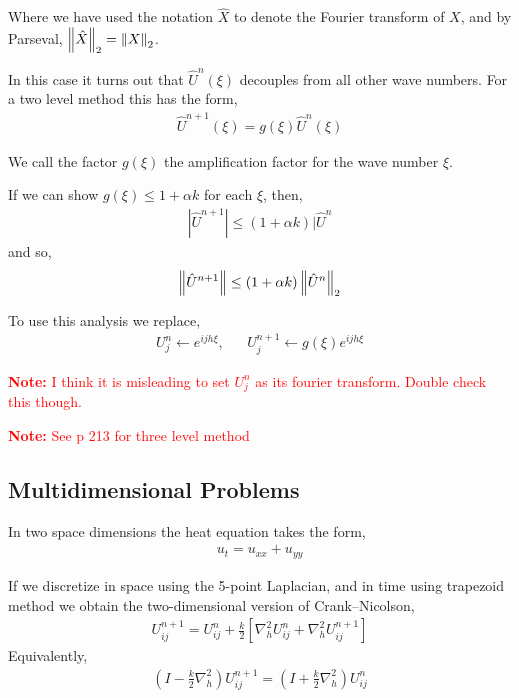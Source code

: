 \documentclass[12pt]{article}
\newcommand{\note}[1]{\textcolor{red}{\textbf{Note:} #1}}
\begin{document}
Where we have used the notation \( \hat{X} \) to denote the Fourier transform of \( X \), and by Parseval, \( \left\lVert\hat{X}\right\rVert_2 = \left\lVert X\right\rVert_2 \).

In this case it turns out that \( \hat{U}^n(\xi) \) decouples from all other wave numbers. For a two level method this has the form,
\begin{align*}
    \hat{U}^{n+1}(\xi) = g(\xi) \hat{U}^n(\xi)
\end{align*}

We call the factor \( g(\xi) \) the amplification factor for the wave number \( \xi \).

If we can show \( g(\xi) \leq 1+\alpha k \) for each \( \xi \), then,
\begin{align*}
    |\hat{U}^{n+1}| \leq (1+\alpha k) |\hat{U}^n
\end{align*}
and so,
\begin{align*}
    \left\lVert\hat{U}^{n+1}\right\rVert \leq (1+\alpha k) \left\lVert\hat{U}^n\right\rVert_2
\end{align*}

To use this analysis we replace,
\begin{align*}
    U_j^n \leftarrow e^{ijh\xi}, && U_j^{n+1} \leftarrow g(\xi) e^{ijh\xi}
\end{align*}

\note{I think it is misleading to set \( U_j^n \) as its fourier transform. Double check this though.}

\note{See p 213 for three level method}

\subsection{Multidimensional Problems}
In two space dimensions the heat equation takes the form,
\begin{align*}
    u_t = u_{xx} + u_{yy}
\end{align*}

If we discretize in space using the 5-point Laplacian, and in time using trapezoid method we obtain the two-dimensional version of Crank--Nicolson,
\begin{align*}
    U_{ij}^{n+1} = U_{ij}^n + \frac{k}{2} \left[ \nabla_h^2 U_{ij}^n + \nabla_h^2 U_{ij}^{n+1} \right]
\end{align*}
Equivalently,
\begin{align*}
    \left( I-\frac{k}{2} \nabla_h^2 \right) U_{ij}^{n+1} = \left( I + \frac{k}{2} \nabla_h^2 \right)U_{ij}^n
\end{align*}
\end{document}
